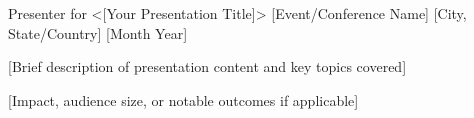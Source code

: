 

\begin{cventries}

%
  \cventry
    {Presenter for <[Your Presentation Title]>} %
    {[Event/Conference Name]} %
    {[City, State/Country]} %
    {[Month Year]} %
    {
      \begin{cvitems} %
        \item {[Brief description of presentation content and key topics covered]}
        \item {[Impact, audience size, or notable outcomes if applicable]}
      \end{cvitems}
    }


\end{cventries}
